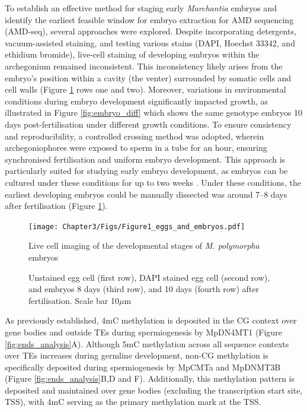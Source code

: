 To establish an effective method for staging early \textit{Marchantia} embryos and identify the earliest feasible window for embryo extraction for AMD sequencing (AMD-seq), several approaches were explored. Despite incorporating detergents, vacuum-assisted staining, and testing various stains (DAPI, Hoechst 33342, and ethidium bromide), live-cell staining of developing embryos within the archegonium remained inconsistent. This inconsistency likely arises from the embryo's position within a cavity (the venter) surrounded by somatic cells and cell walls (Figure \ref{fig:egg_embryo} rows one and two). Moreover, variations in environmental conditions during embryo development significantly impacted growth, as illustrated in Figure \ref{fig:embryo_diff} which shows the same genotype embryos 10 days post-fertilisation under different growth conditions. To ensure consistency and reproducibility, a controlled crossing method was adopted, wherein archegoniophores were exposed to sperm in a tube for an hour, ensuring synchronised fertilisation and uniform embryo development. This approach is particularly suited for studying early embryo development, as embryos can be cultured under these conditions for up to two weeks \cite{RN139}. Under these conditions, the earliest developing embryos could be manually dissected was around 7–8 days after fertilisation (Figure \ref{fig:egg_embryo}).

\begin{figure}[htbp!] 
\centering    
    \texttt{[image: Chapter3/Figs/Figure1\_eggs\_and\_embryos.pdf]}
\caption{Live cell imaging of the developmental stages of \textit{M. polymorpha} embryos}
\label{fig:egg_embryo}
\captionsetup{font=small}
    \caption*{Unstained egg cell (first row), DAPI stained egg cell (second row), and embryos 8 days (third row), and 10 days (fourth row) after fertilisation. Scale bar 10$\mu$m}
\end{figure}

As previously established, 4mC methylation is deposited in the CG context over gene bodies and outside TEs during spermiogenesis by MpDN4MT1 (Figure \ref{fig:ends_analysis}A)\cite{RN189}. Although 5mC methylation across all sequence contexts over TEs increases during germline development, non-CG methylation is specifically deposited during spermiogenesis by MpCMTa and MpDNMT3B (Figure \ref{fig:ends_analysis}B,D and F)\cite{RN189}. Additionally, this methylation pattern is deposited and maintained over gene bodies (excluding the transcription start site, TSS), with 4mC serving as the primary methylation mark at the TSS. 

